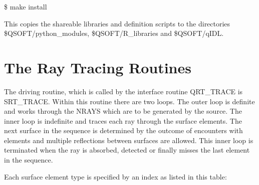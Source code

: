 \documentclass[letterpaper,10pt,english]{sphinxmanual}
\begin{document}
\$ make install

This copies the shareable libraries and definition scripts to the
directories \$QSOFT/python\_modules, \$QSOFT/R\_libraries and
\$QSOFT/qIDL.


\section{The Ray Tracing Routines}
\label{\detokenize{xsrt_ray_tracing:the-ray-tracing-routines}}\label{\detokenize{xsrt_ray_tracing::doc}}
The driving routine, which is called by the interface routine
QRT\_TRACE is SRT\_TRACE. Within this routine there are two loops.
The outer loop is definite and works through the NRAYS which are
to be generated by the source.
The inner loop is indefinite and traces each ray through the surface elements.
The next surface in the sequence is determined by the outcome of encounters
with elements and multiple reflections between surfaces are allowed.
This inner loop is terminated when the ray is absorbed, detected or
finally misses the last element in the sequence.

Each surface element type is specified by an index as listed in this table:
\end{document}
